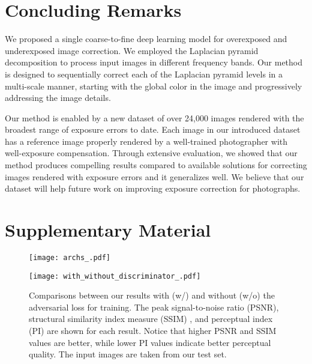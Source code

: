 \documentclass[final]{cvpr}
\begin{document}
\section{Concluding Remarks}\label{sec:conclusion}

We proposed a single coarse-to-fine deep learning model for overexposed and underexposed image correction. We employed the Laplacian pyramid decomposition to process input images in different frequency bands. Our method is designed to sequentially correct each of the Laplacian pyramid levels in a multi-scale manner, starting with the global color in the image and progressively addressing the image details. 

Our method is enabled by a new dataset of over 24,000 images rendered with the broadest range of exposure errors to date. Each image in our introduced dataset has a reference image properly rendered by a well-trained photographer with well-exposure compensation. Through extensive evaluation, we showed that our method produces compelling results compared to available solutions for correcting images rendered with exposure errors and it generalizes well. We believe that our dataset will help future work on improving exposure correction for photographs.










\newcommand{\beginsupplement}{\setcounter{table}{0}
        \renewcommand{\thetable}{S\arabic{table}}\setcounter{figure}{0}
        \renewcommand{\thefigure}{S\arabic{figure}}}

\section{Supplementary Material}
\beginsupplement


\begin{figure*}[]
\centering
\vspace{-1mm}
\texttt{[image: archs\_.pdf]}
\vspace{-6mm}
 \label{fig:arch}
\end{figure*}

\begin{figure*}[]
\centering
\texttt{[image: with\_without\_discriminator\_.pdf]}
\vspace{-2mm}
\caption{Comparisons between our results with (w/) and without (w/o) the adversarial loss for training. The peak signal-to-noise ratio (PSNR), structural similarity index measure (SSIM) \cite{wang2004image}, and perceptual index (PI) \cite{blau20182018} are shown for each result. Notice that higher PSNR and SSIM values are better, while lower PI values indicate better perceptual quality. The input images are taken from our test set.\vspace{-2mm}} \label{fig:ablation-with_without_discriminator}
\end{figure*}
\end{document}
